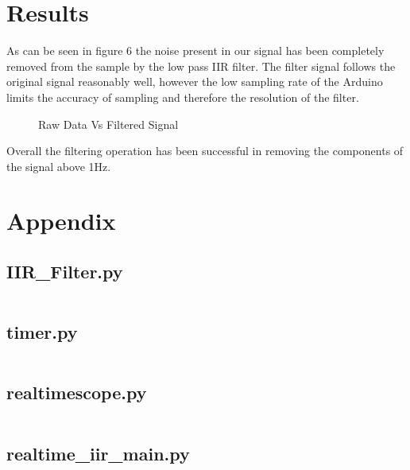 \documentclass{article}
\begin{document}
\section{Results}
As can be seen in figure 6 the noise present in our signal has been completely removed from the sample by the low pass IIR filter. The filter signal follows the original signal reasonably well, however the low sampling rate of the Arduino limits the accuracy of sampling and therefore the resolution of the filter.  
\newline
\begin{figure}[h!]
    \centering
    
    \caption{Raw Data Vs Filtered Signal}
    \label{fig:universe}
\end{figure}
\newline 
Overall the filtering operation has been successful in removing the components of the signal above 1Hz. 

\section{Appendix}
\subsection{IIR\_Filter.py}
\inputminted{python}{IIR_filter.py}
\subsection{timer.py}
\inputminted{python}{timer.py}
\subsection{realtimescope.py}
\inputminted{python}{realtimescope.py}
\subsection{realtime\_iir\_main.py}
\inputminted{python}{realtime_iir_main.py}
\end{document}
